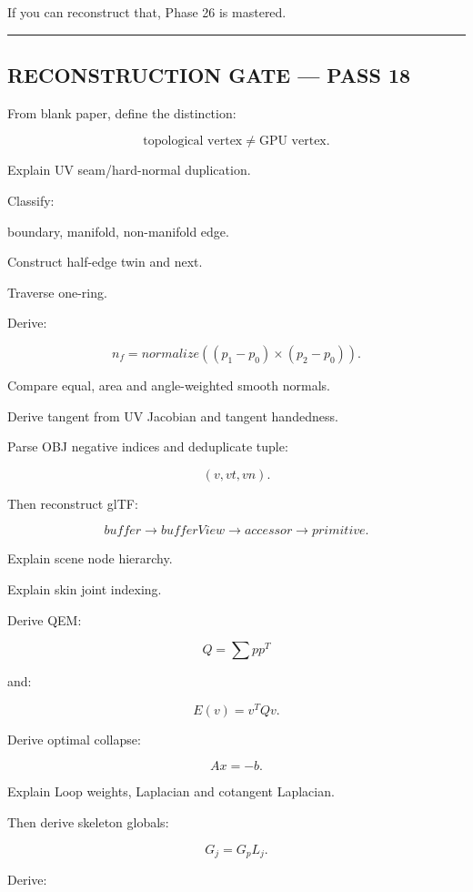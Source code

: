 If you can reconstruct that, Phase 26 is mastered.

\begin{center}\rule{0.5\linewidth}{0.5pt}\end{center}

\subsection{RECONSTRUCTION GATE --- PASS 18}\label{04-visual-computing-ii-ch041-reconstruction-gate-pass-18}

\hypertarget{04-visual-computing-ii-ch041-reconstruction-gate-pass-18}{}

From blank paper, define the distinction:

\[
\text{topological vertex}
\neq
\text{GPU vertex}.
\]

Explain UV seam/hard-normal duplication.

Classify:

boundary, manifold, non-manifold edge.

Construct half-edge twin and next.

Traverse one-ring.

Derive:

\[
n_f=
normalize(
(p_1-p_0)\times(p_2-p_0)
).
\]

Compare equal, area and angle-weighted smooth normals.

Derive tangent from UV Jacobian and tangent handedness.

Parse OBJ negative indices and deduplicate tuple:

\[
(v,vt,vn).
\]

Then reconstruct glTF:

\[
buffer
\rightarrow
bufferView
\rightarrow
accessor
\rightarrow
primitive.
\]

Explain scene node hierarchy.

Explain skin joint indexing.

Derive QEM:

\[
Q=
\sum pp^T
\]

and:

\[
E(v)=v^TQv.
\]

Derive optimal collapse:

\[
Ax=-b.
\]

Explain Loop weights, Laplacian and cotangent Laplacian.

Then derive skeleton globals:

\[
G_j=
G_pL_j.
\]

Derive:

